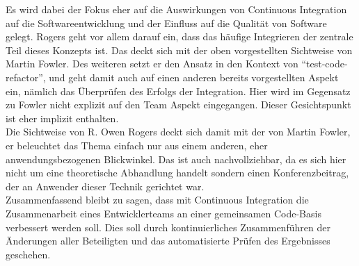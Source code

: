 Es wird dabei der Fokus eher auf die Auswirkungen von Continuous Integration auf die Softwareentwicklung und der Einfluss auf die Qualität von Software gelegt. Rogers geht vor allem darauf ein, dass das häufige Integrieren der zentrale Teil dieses Konzepts ist. Das deckt sich mit der oben vorgestellten Sichtweise von Martin Fowler. Des weiteren setzt er den Ansatz in den Kontext von "`test-code-refactor"', und geht damit auch auf einen anderen bereits vorgestellten Aspekt ein, nämlich das Überprüfen des Erfolgs der Integration. 
Hier wird im Gegensatz zu Fowler nicht explizit auf den Team Aspekt eingegangen. Dieser Gesichtspunkt ist eher implizit enthalten.\\
Die Sichtweise von R. Owen Rogers deckt sich damit mit der von Martin Fowler, er beleuchtet das Thema einfach nur aus einem anderen, eher anwendungsbezogenen Blickwinkel. Das ist auch nachvollziehbar, da es sich hier nicht um eine theoretische Abhandlung handelt sondern einen Konferenzbeitrag, der an Anwender dieser Technik gerichtet war.\\

Zusammenfassend bleibt zu sagen, dass mit Continuous Integration die Zusammenarbeit eines Entwicklerteams an einer gemeinsamen Code-Basis verbessert werden soll. Dies soll durch kontinuierliches Zusammenführen der Änderungen aller Beteiligten und das automatisierte Prüfen des Ergebnisses geschehen.
